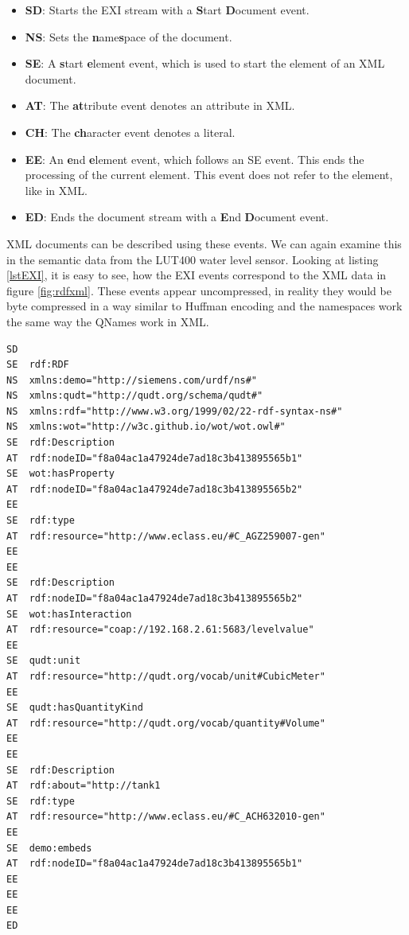 \begin{itemize}

\item \textbf{SD}: Starts the EXI stream with a \textbf{S}tart \textbf{D}ocument event.
\item \textbf{NS}: Sets the \textbf{n}ame\textbf{s}pace of the document.
\item \textbf{SE}: A \textbf{s}tart \textbf{e}lement event, which is used to start the element of an XML document.
\item \textbf{AT}: The \textbf{at}tribute event denotes an attribute in XML. 
\item \textbf{CH}: The \textbf{ch}aracter event denotes a literal.
\item \textbf{EE}: An \textbf{e}nd \textbf{e}lement event, which follows an SE event. This ends the processing of the current element. This event does not refer to the element, like in XML.
\item \textbf{ED}: Ends the document stream with a \textbf{E}nd \textbf{D}ocument event.
\end{itemize}

XML documents can be described using these events. We can again examine this in the semantic data from the LUT400 water level sensor. Looking at listing \ref{lstEXI}, it is easy to see, how the EXI events correspond to the XML data in figure \ref{fig:rdfxml}. These events appear uncompressed, in reality they would be byte compressed in a way similar to Huffman encoding and the namespaces work the same way the QNames work in XML\cite{.02.10.2017b}.



\begin{lstlisting}[caption={The LUT400's XML data as serialized in EXI events.},captionpos=b, label={lstEXI}]
SD
SE	rdf:RDF
NS	xmlns:demo="http://siemens.com/urdf/ns#"
NS	xmlns:qudt="http://qudt.org/schema/qudt#"
NS	xmlns:rdf="http://www.w3.org/1999/02/22-rdf-syntax-ns#"
NS	xmlns:wot="http://w3c.github.io/wot/wot.owl#"
SE	rdf:Description
AT	rdf:nodeID="f8a04ac1a47924de7ad18c3b413895565b1"
SE	wot:hasProperty 
AT	rdf:nodeID="f8a04ac1a47924de7ad18c3b413895565b2"
EE
SE	rdf:type
AT	rdf:resource="http://www.eclass.eu/#C_AGZ259007-gen"
EE
EE
SE	rdf:Description
AT	rdf:nodeID="f8a04ac1a47924de7ad18c3b413895565b2"
SE	wot:hasInteraction
AT	rdf:resource="coap://192.168.2.61:5683/levelvalue"
EE
SE	qudt:unit
AT	rdf:resource="http://qudt.org/vocab/unit#CubicMeter"
EE
SE	qudt:hasQuantityKind
AT	rdf:resource="http://qudt.org/vocab/quantity#Volume"
EE
EE
SE	rdf:Description
AT	rdf:about="http://tank1
SE	rdf:type
AT	rdf:resource="http://www.eclass.eu/#C_ACH632010-gen"
EE
SE	demo:embeds
AT	rdf:nodeID="f8a04ac1a47924de7ad18c3b413895565b1"
EE
EE
EE
ED
\end{lstlisting}



